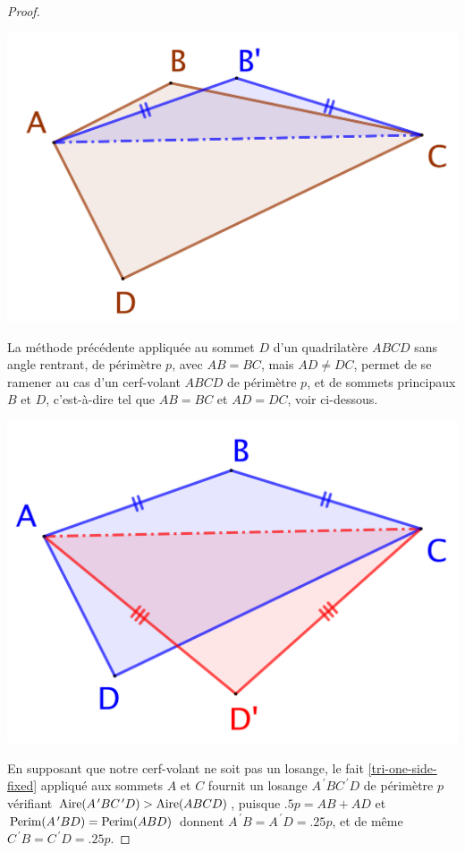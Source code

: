 \begin{proof}
	\begin{center}
		\includegraphics[scale=.4]{content/quadrilateral/gene/convex-gene.png}
	\end{center}
	
	
	La méthode précédente appliquée au sommet $D$ d'un quadrilatère $ABCD$ sans angle rentrant, de périmètre $p$, avec $AB = BC$, mais $AD \neq DC$, permet de se ramener au cas d'un cerf-volant $ABCD$ de périmètre $p$, et de sommets principaux $B$ et $D$, c'est-à-dire tel que $AB = BC$ et $AD = DC$, voir ci-dessous.  

	\begin{center}
		\includegraphics[scale=.4]{content/quadrilateral/gene/convex-one-paire.png}
	\end{center}
	
	
	En supposant que notre cerf-volant ne soit pas un losange, le fait \ref{tri-one-side-fixed} appliqué aux sommets $A$ et $C$ fournit un losange $A^{\,\prime}BC^{\,\prime}D$ de périmètre $p$ vérifiant $\mathrm{Aire}(A^{\,\prime}BC^{\,\prime}D) > \mathrm{Aire}(ABCD)$, 
	puisque
	$\num{.5} p = AB + AD$
	et
	$\mathrm{Perim}(A^{\,\prime}BD) = \mathrm{Perim}(ABD)$
	donnent
	$A^{\,\prime}B = A^{\,\prime}D = \num{.25} p$,
	et de même
	$C^{\,\prime}B = C^{\,\prime}D = \num{.25} p$.


\end{proof}
